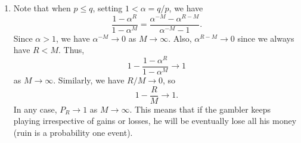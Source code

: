 \documentclass[10pt]{article}
\newcounter{prob}
\begin{document}
\begin{enumerate}
            \item Note that when $p \leq q$, setting $1 < \alpha = q / p$, we have \[
                \frac{1 - \alpha^R}{1 - \alpha^M} = \frac{\alpha^{-M} - \alpha^{R
                -M}}{\alpha^{-M} - 1}.
            \] Since $\alpha > 1$, we have $\alpha^{-M} \to 0$ as $M \to \infty$.
            Also, $\alpha^{R - M} \to 0$ since we always have $R < M$. Thus, \[
                1 - \frac{1 - \alpha^R}{1 - \alpha^M} \to 1
            \] as $M \to \infty$. Similarly, we have $R / M \to 0$, so \[
                1 - \frac{R}{M} \to 1.
            \] In any case, $P_R \to 1$ as $M \to \infty$. This means that if the
            gambler keeps playing irrespective of gains or losses, he will be
            eventually lose all his money (ruin is a probability one event).
        \end{enumerate}
\end{document}
